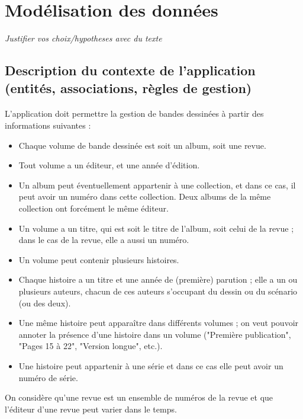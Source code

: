 \documentclass[12pt]{report}
\begin{document}
\section{Modélisation des données}

\emph{Justifier vos choix/hypotheses avec du texte}

\subsection{Description du contexte de l'application (entités, associations, règles de gestion)}

\paragraph{}
L'application doit permettre la gestion de bandes dessinées à partir des
informations suivantes :

\begin{itemize}
	\item Chaque volume de bande dessinée est soit un album, soit une revue.
	\item Tout volume a un éditeur, et une année d’édition.
	\item Un album peut éventuellement appartenir à une collection, et dans ce cas, il
		peut avoir un numéro dans cette collection. Deux albums de la même collection
		ont forcément le même éditeur.
	\item Un volume a un titre, qui est soit le titre de l'album, soit celui de la
		revue ; dans le cas de la revue, elle a aussi un numéro.
	\item Un volume peut contenir plusieurs histoires.
	\item Chaque histoire a un titre et une année de (première) parution ; elle a un
		ou plusieurs auteurs, chacun de ces auteurs s’occupant du dessin ou du
		scénario (ou des deux).
	\item Une même histoire peut apparaître dans différents volumes ; on veut pouvoir
		annoter la présence d’une histoire dans un volume ("Première publication",
		"Pages 15 à 22", "Version longue", etc.).
	\item Une histoire peut appartenir à une série et dans ce cas elle peut avoir un
		numéro de série.
\end{itemize}

On considère qu'une revue est un ensemble de numéros de la revue et que
l'éditeur d'une revue peut varier dans le temps.
\end{document}
